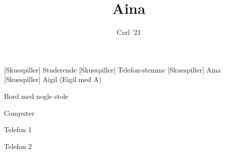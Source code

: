 \documentclass[a4paper,11pt]{article}
\title{Aina}
\author{Carl '21}
\begin{document}
\maketitle

\begin{roles}
[Skuespiller] Studerende
[Skuespiller] Telefon-stemme
[Skuespiller] Aina
[Skuespiller] Aigil (Eigil med A)
\end{roles}

\begin{props}
\item Bord med nogle stole
\item Computer
\item Telefon 1
\item Telefon 2
\end{props}
\end{document}
